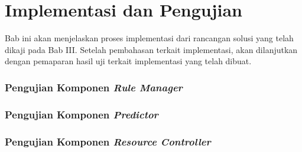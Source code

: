 \chapter{Implementasi dan Pengujian}
Bab ini akan menjelaskan proses implementasi dari rancangan solusi yang telah dikaji pada Bab III. Setelah pembahasan terkait implementasi, akan dilanjutkan dengan pemaparan hasil uji terkait implementasi yang telah dibuat.












\subsection{Pengujian Komponen \textit{Rule Manager}}
\subsection{Pengujian Komponen \textit{Predictor}}
\subsection{Pengujian Komponen \textit{Resource Controller}}
